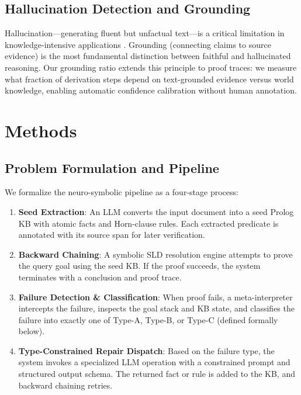 \documentclass[11pt,letterpaper]{article}
\begin{document}
\subsection{Hallucination Detection and Grounding}

Hallucination---generating fluent but unfactual text---is a critical limitation in knowledge-intensive applications \citep{Alansari2025}. Grounding (connecting claims to source evidence) is the most fundamental distinction between faithful and hallucinated reasoning. Our grounding ratio extends this principle to proof traces: we measure what fraction of derivation steps depend on text-grounded evidence versus world knowledge, enabling automatic confidence calibration without human annotation.

\section{Methods}

\subsection{Problem Formulation and Pipeline}

We formalize the neuro-symbolic pipeline as a four-stage process:

\begin{enumerate}
  \item \textbf{Seed Extraction}: An LLM converts the input document into a seed Prolog KB with atomic facts and Horn-clause rules. Each extracted predicate is annotated with its source span for later verification.

  \item \textbf{Backward Chaining}: A symbolic SLD resolution engine attempts to prove the query goal using the seed KB. If the proof succeeds, the system terminates with a conclusion and proof trace.

  \item \textbf{Failure Detection \& Classification}: When proof fails, a meta-interpreter intercepts the failure, inspects the goal stack and KB state, and classifies the failure into exactly one of Type-A, Type-B, or Type-C (defined formally below).

  \item \textbf{Type-Constrained Repair Dispatch}: Based on the failure type, the system invokes a specialized LLM operation with a constrained prompt and structured output schema. The returned fact or rule is added to the KB, and backward chaining retries.
\end{enumerate}
\end{document}
